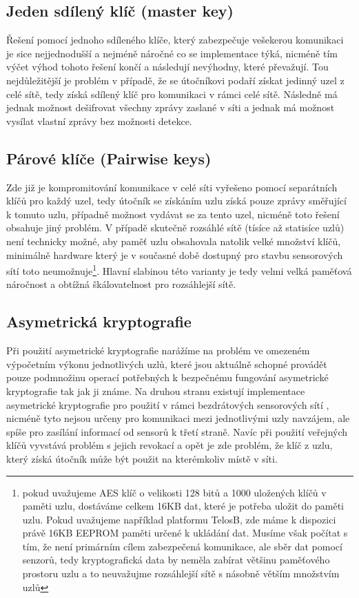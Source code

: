 \documentclass[11pt,final,twoside]{fithesis2}
\begin{document}
\subsection{Jeden sdílený klíč (master key)} Řešení pomocí jednoho sdíleného klíče, který zabezpečuje vešekerou komunikaci je sice nejjednodušší a 
nejméně náročné co se implementace týká, nicméně tím výčet výhod tohoto řešení končí a následují nevýhodny, které převažují. Tou nejdůležitější 
je problém v případě, že se útočníkovi podaří získat jedinný uzel z celé sítě, tedy získá sdílený klíč pro komunikaci v rámci celé sítě. Následně 
má jednak možnost dešifrovat všechny zprávy zaslané v síti a jednak má možnost vysílat vlastní zprávy bez možnosti detekce.

\subsection{Párové klíče (Pairwise keys)} Zde již je kompromitování komunikace v celé síti vyřešeno pomocí separátních klíčů pro každý uzel, 
tedy útočník se získáním uzlu získá pouze zprávy směřující k tomuto uzlu, případně možnost vydávat se za tento uzel, nicméně toto řešení 
obsahuje jiný problém. V případě skutečně rozsáhlé sítě (tísíce až statisíce uzlů) není technicky možné, aby paměť uzlu obsahovala natolik 
velké množství klíčů, minimálně hardware který je v současné době dostupný pro stavbu sensorových sítí toto neumožnuje\footnote{pokud uvažujeme 
AES\cite{Daemen1999} klíč o velikosti 128 bitů a 1000 uložených klíčů v paměti uzlu, dostáváme celkem 16KB dat, které je potřeba uložit do paměti uzlu. 
Pokud uvažujeme například platformu TelosB\cite{MemsicInc.}, zde máme k dispozici právě 16KB EEPROM paměti určené k ukládání dat. Musíme však počítat s 
tím, že není primárním cílem zabezpečená komunikace, ale sběr dat pomocí senzorů, tedy kryptografická data by neměla zabírat většinu paměťového prostoru 
uzlu a to neuvažujme rozsáhlejší sítě s násobně větším množstvím uzlů}. Hlavní slabinou této varianty je tedy velmi velká paměťová náročnost a obtížná 
škálovatelnost pro rozsáhlejší sítě. 

\subsection{Asymetrická kryptografie} Při použití asymetrické kryptografie narážíme na problém ve omezeném výpočetním výkonu jednotlivých uzlů, 
které jsou aktuálně schopné provádět pouze podmnožinu operací potřebných k bezpečnému fungování asymetrické kryptografie tak jak ji známe.
Na druhou stranu existují implementace asymetrické kryptografie pro použití v rámci bezdrátových sensorových sítí \cite{Watro2004}, nicméně 
tyto nejsou určeny pro komunikaci mezi jednotlivými uzly navzájem, ale spíše pro zasílání informací od sensorů k třetí straně. 
Navíc při použití veřejných klíčů vyvstává problém s jejich revokací a opět je zde problém, že klíč z uzlu, který získá útočník může být použit 
na kterémkoliv místě v síti.
\end{document}
